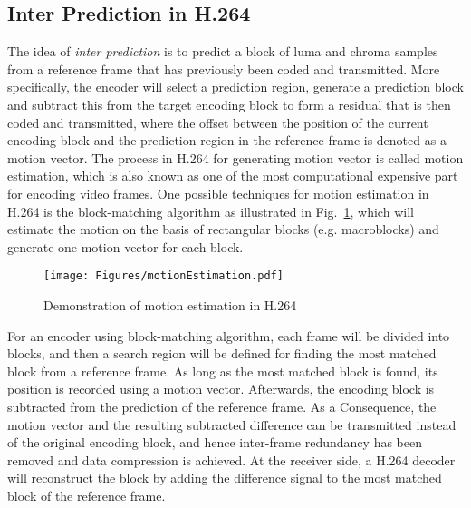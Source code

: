 \subsection{Inter Prediction in H.264}
\label{sec::MEIntro}
%
The idea of \emph{inter prediction} is to predict a block of luma and chroma samples from a reference frame that has previously been coded and transmitted.
More specifically, the encoder will select a prediction region, generate a prediction block and subtract this from the target encoding block to form a residual that is then coded and transmitted, where the offset between the position of the current encoding block and the prediction region in the reference frame is denoted as a motion vector.
The process in H.264 for generating motion vector is called motion estimation, which is also known as one of the most computational expensive part for encoding video frames.
One possible techniques for motion estimation in H.264 is the block-matching algorithm as illustrated in Fig.~\ref{fig::MEIntro}, which will estimate the motion on the basis of rectangular blocks (e.g. macroblocks) and generate one motion vector for each block.
%
\begin{figure}
\begin{center}
\texttt{[image: Figures/motionEstimation.pdf]}
\caption{\label{fig::MEIntro}Demonstration of motion estimation in H.264}
\end{center}
\end{figure}
%

For an encoder using block-matching algorithm, each frame will be divided into blocks, and then a search region will be defined for finding the most matched block from a reference frame.
As long as the most matched block is found, its position is recorded using a motion vector.
Afterwards, the encoding block is subtracted from the prediction of the reference frame.
As a Consequence, the motion vector and the resulting subtracted difference can be transmitted instead of the original encoding block, and hence inter-frame redundancy has been removed and data compression is achieved.
At the receiver side, a H.264 decoder will reconstruct the block by adding the difference signal to the most matched block of the reference frame.